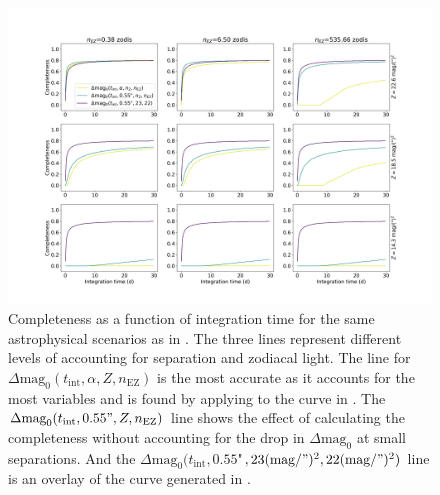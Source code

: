 \begin{figure}
  \begin{center}
    \includegraphics[width=\textwidth]{ch3/figures/fZ_fEZ_comps_flat.png}
  \end{center}
  \caption{Completeness as a function of integration time for the same astrophysical
  scenarios as in . The three lines represent different levels
  of accounting for separation and zodiacal light. The line for
  $\Delta\textrm{mag}_0(t_\textrm{int}, \alpha, Z, n_\textrm{EZ})$
  is the most accurate as it accounts for the most variables and is 
  found by applying  to the curve in .
  The 
  $\Delta\textrm{mag}_0(t_\textrm{int}, 0.55", Z, n_\textrm{EZ})$
  line shows the effect of calculating the completeness without accounting for
  the drop in $\Delta\textrm{mag}_0$ at small separations. And the
  $\Delta\mathrm{mag}_0(t_\mathrm{int}, 0.55$"$, 23 (\textrm{mag}/")^2, 22(\textrm{mag}/")^2)$
  line is an overlay of the curve generated in .
  }
  \label{fig:fZ_fEZ_comps}
\end{figure}

